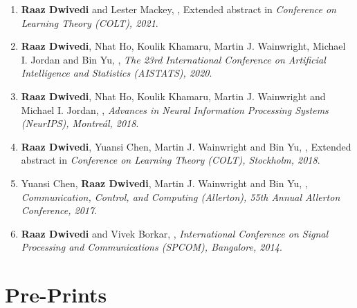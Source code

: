 \documentclass[margin,centered]{res}
\begin{document}
\begin{resume}
\begin{enumerate}[label={C\arabic*.},leftmargin=*]
\item \textbf{Raaz Dwivedi} and Lester Mackey, \href{https://arxiv.org/abs/2105.05842}{}, Extended abstract in \emph{Conference
on Learning Theory (COLT), 2021}.
\item \textbf{Raaz Dwivedi}\eqc, {Nhat Ho}\eqc, Koulik Khamaru\eqc, Martin
J. Wainwright, Michael I. Jordan and Bin Yu, \href{https://arxiv.org/pdf/1902.00194.pdf} {},  \emph{ The 23rd International Conference on Artificial Intelligence and Statistics (AISTATS), 2020}.
\item \textbf{Raaz Dwivedi}\eqc, {Nhat Ho}\eqc, Koulik Khamaru\eqc,
Martin
J. Wainwright and
Michael I. Jordan, \href{https://people.eecs.berkeley.edu/~minhnhat/EM_misspecified_unified.pdf}
{},
\emph{Advances in Neural Information Processing Systems (NeurIPS), Montre{\'a}l, 2018}.
\item \textbf{Raaz Dwivedi}\eqc, Yuansi Chen\eqc, Martin
J. Wainwright and Bin Yu, \href{https://jmlr.csail.mit.edu/papers/volume20/19-306/19-306.pdf}
{
}, Extended abstract in \emph{Conference
on Learning
Theory (COLT), Stockholm, 2018}. 
\item Yuansi Chen\eqc, \textbf{Raaz Dwivedi}\eqc, Martin
J. Wainwright and Bin Yu, \href{https://jmlr.org/papers/volume19/18-158/18-158.pdf}
{},
\textit{Communication, Control, and Computing (Allerton),
55th Annual Allerton Conference, 2017}.
\item \textbf{Raaz Dwivedi} and Vivek Borkar, \href{https://ieeexplore.ieee.org/abstract/document/6983986/}
{},
\textit{International
Conference on Signal Processing and Communications (SPCOM), Bangalore, 2014}.
\end{enumerate}

\section{\sc Pre-Prints} 


\end{resume}
\end{document}
